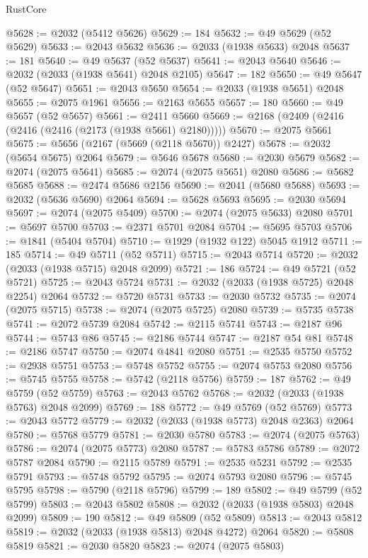 \begin{lexlean}{RustCore}
\begin{coremodule}
@5628 := @2032 (@5412 @5626)
@5629 := 184
@5632 := @49 @5629 (@52 @5629)
@5633 := @2043 @5632
@5636 := @2033 (@1938 @5633) @2048
@5637 := 181
@5640 := @49 @5637 (@52 @5637)
@5641 := @2043 @5640
@5646 := @2032 (@2033 (@1938 @5641) @2048 @2105)
@5647 := 182
@5650 := @49 @5647 (@52 @5647)
@5651 := @2043 @5650
@5654 := @2033 (@1938 @5651) @2048
@5655 := @2075 @1961
@5656 := @2163 @5655
@5657 := 180
@5660 := @49 @5657 (@52 @5657)
@5661 := @2411 @5660
@5669 := @2168 (@2409 (@2416 (@2416 (@2416 (@2173 (@1938 @5661) @2180)))))
@5670 := @2075 @5661
@5675 := @5656 (@2167 (@5669 (@2118 @5670)) @2427)
@5678 := @2032 (@5654 @5675) @2064
@5679 := @5646 @5678
@5680 := @2030 @5679
@5682 := @2074 (@2075 @5641)
@5685 := @2074 (@2075 @5651) @2080
@5686 := @5682 @5685
@5688 := @2474 @5686 @2156
@5690 := @2041 (@5680 @5688)
@5693 := @2032 (@5636 @5690) @2064
@5694 := @5628 @5693
@5695 := @2030 @5694
@5697 := @2074 (@2075 @5409)
@5700 := @2074 (@2075 @5633) @2080
@5701 := @5697 @5700
@5703 := @2371 @5701 @2084
@5704 := @5695 @5703
@5706 := @1841 (@5404 @5704)
@5710 := @1929 (@1932 @122) @5045 @1912
@5711 := 185
@5714 := @49 @5711 (@52 @5711)
@5715 := @2043 @5714
@5720 := @2032 (@2033 (@1938 @5715) @2048 @2099)
@5721 := 186
@5724 := @49 @5721 (@52 @5721)
@5725 := @2043 @5724
@5731 := @2032 (@2033 (@1938 @5725) @2048 @2254) @2064
@5732 := @5720 @5731
@5733 := @2030 @5732
@5735 := @2074 (@2075 @5715)
@5738 := @2074 (@2075 @5725) @2080
@5739 := @5735 @5738
@5741 := @2072 @5739 @2084
@5742 := @2115 @5741
@5743 := @2187 @96
@5744 := @5743 @86
@5745 := @2186 @5744
@5747 := @2187 @54 @81
@5748 := @2186 @5747
@5750 := @2074 @4841 @2080
@5751 := @2535 @5750
@5752 := @2938 @5751
@5753 := @5748 @5752
@5755 := @2074 @5753 @2080
@5756 := @5745 @5755
@5758 := @5742 (@2118 @5756)
@5759 := 187
@5762 := @49 @5759 (@52 @5759)
@5763 := @2043 @5762
@5768 := @2032 (@2033 (@1938 @5763) @2048 @2099)
@5769 := 188
@5772 := @49 @5769 (@52 @5769)
@5773 := @2043 @5772
@5779 := @2032 (@2033 (@1938 @5773) @2048 @2363) @2064
@5780 := @5768 @5779
@5781 := @2030 @5780
@5783 := @2074 (@2075 @5763)
@5786 := @2074 (@2075 @5773) @2080
@5787 := @5783 @5786
@5789 := @2072 @5787 @2084
@5790 := @2115 @5789
@5791 := @2535 @5231
@5792 := @2535 @5791
@5793 := @5748 @5792
@5795 := @2074 @5793 @2080
@5796 := @5745 @5795
@5798 := @5790 (@2118 @5796)
@5799 := 189
@5802 := @49 @5799 (@52 @5799)
@5803 := @2043 @5802
@5808 := @2032 (@2033 (@1938 @5803) @2048 @2099)
@5809 := 190
@5812 := @49 @5809 (@52 @5809)
@5813 := @2043 @5812
@5819 := @2032 (@2033 (@1938 @5813) @2048 @4272) @2064
@5820 := @5808 @5819
@5821 := @2030 @5820
@5823 := @2074 (@2075 @5803)

\end{coremodule}
\end{lexlean}
